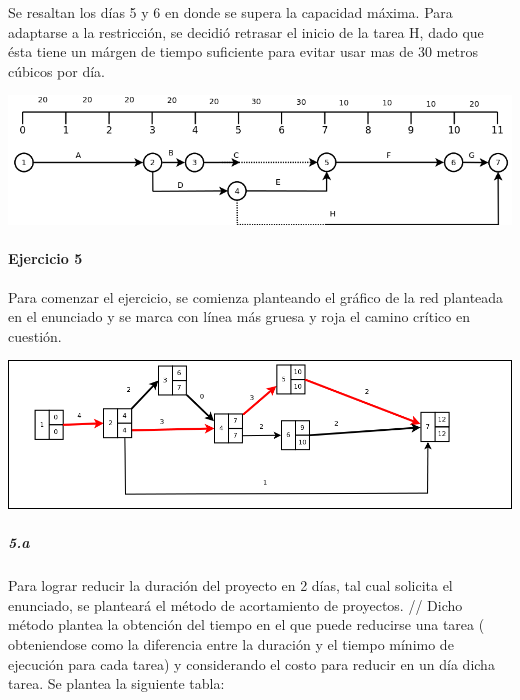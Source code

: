 \documentclass[a4paper,10pt]{article}
\begin{document}
  Se resaltan los días 5 y 6 en donde se supera la capacidad máxima. Para adaptarse a la restricción, se decidió retrasar el inicio de la tarea H, 
  dado que ésta tiene un márgen de tiempo suficiente para evitar usar mas de 30 metros cúbicos por día.
  \begin{center}
    \includegraphics[scale=0.55,keepaspectratio=true]{img/ej4-fechatemprana2.png} 
  \end{center}

  
  
\paragraph{Ejercicio 5}

Para comenzar el ejercicio, se comienza planteando el gr\'afico de la red planteada en el enunciado y se marca con l\'inea m\'as gruesa y roja el camino cr\'itico en cuesti\'on.

  \begin{center}
    \includegraphics[scale=0.4,keepaspectratio=true]{img/ej5-red.png} 
  \end{center}

\subparagraph {5.a}
Para lograr reducir la duraci\'on del proyecto en 2 d\'ias, tal cual solicita el enunciado, se plantear\'a el m\'etodo de acortamiento de proyectos. //
Dicho m\'etodo plantea la obtenci\'on del tiempo en el que puede reducirse una tarea ( obteniendose como la diferencia entre la duraci\'on y el tiempo m\'inimo de ejecuci\'on para cada tarea) y 
considerando el costo para reducir en un d\'ia dicha tarea. Se plantea la siguiente tabla:
\end{document}
